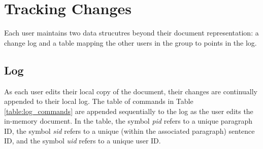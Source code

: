 \section{Tracking Changes}

Each user maintains two data strucutres beyond their document
representation: a change log and a table mapping the other users in 
the group to points in the log. 


\subsection{Log}
As each user edits their local copy of the document, their changes
are continually appended to their local log. The table of commands in
Table \ref{table:log_commands} are appended sequentially to the log as the user edits the in-memory
document. In the table, the symbol \emph{pid} refers to a unique paragraph ID, the symbol \emph{sid}
refers to a unique (within the associated paragraph) sentence ID, and the symbol \emph{uid} refers
to a unique user ID.

